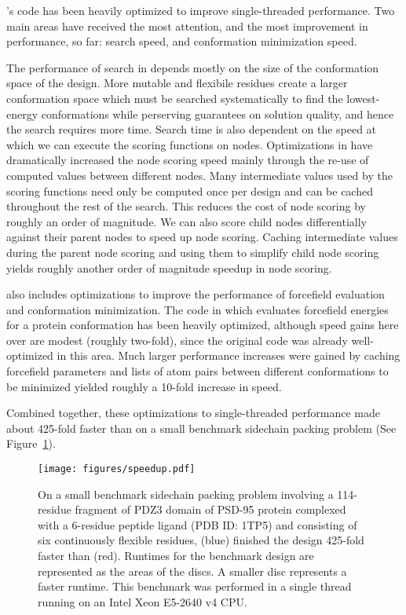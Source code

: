 's code has been heavily optimized to improve single-threaded performance. Two main areas have received the most attention, and the most improvement in performance, so far: \as search speed, and conformation minimization speed.

The performance of \as search in \osprey depends mostly on the size of the conformation space of the design. More mutable and flexibile residues create a larger conformation space which must be searched systematically to find the lowest-energy conformations while perserving guarantees on solution quality, and hence the search requires more time. Search time is also dependent on the speed at which we can execute the scoring functions on \as nodes. Optimizations in  have dramatically increased the \as node scoring speed mainly through the re-use of computed values between different nodes. Many intermediate values used by the \as scoring functions need only be computed once per design and can be cached throughout the rest of the search. This reduces the cost of node scoring by roughly an order of magnitude. We can also score child nodes differentially against their parent nodes to speed up node scoring. Caching intermediate values during the parent node scoring and using them to simplify child node scoring yields roughly another order of magnitude speedup in \as node scoring. %

 also includes optimizations to improve the performance of forcefield evaluation and conformation minimization. The code in  which evaluates forcefield energies for a protein conformation has been heavily optimized, although speed gains here over  are modest (roughly two-fold), since the original code was already well-optimized in this area. Much larger performance increases were gained by caching forcefield parameters and lists of atom pairs between different conformations to be minimized yielded roughly a 10-fold increase in speed. %

Combined together, these optimizations to single-threaded performance made  about 425-fold faster than  on a small benchmark sidechain packing problem (See Figure~\ref{fig:speedup}).

\begin{figure}
\center
\texttt{[image: figures/speedup.pdf]}
\caption{On a small benchmark sidechain packing problem involving a 114-residue fragment of PDZ3 domain of PSD-95 protein complexed with a 6-residue peptide ligand (PDB ID: 1TP5) and consisting of six continuously flexible residues,  (blue) finished the design 425-fold faster than  (red). Runtimes for the benchmark design are represented as the areas of the discs. A smaller disc represents a faster runtime. This benchmark was performed in a single thread running on an Intel Xeon E5-2640 v4 CPU.}
\label{fig:speedup}
\end{figure}
